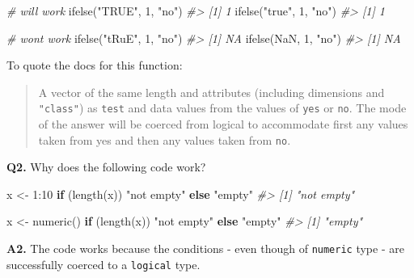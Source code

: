 \documentclass[
]{book}
\newenvironment{Shaded}{\begin{snugshade}}{\end{snugshade}}
\newcommand{\CommentTok}[1]{\textcolor[rgb]{0.56,0.35,0.01}{\textit{#1}}}
\newcommand{\ConstantTok}[1]{\textcolor[rgb]{0.00,0.00,0.00}{#1}}
\newcommand{\ControlFlowTok}[1]{\textcolor[rgb]{0.13,0.29,0.53}{\textbf{#1}}}
\newcommand{\DecValTok}[1]{\textcolor[rgb]{0.00,0.00,0.81}{#1}}
\newcommand{\FunctionTok}[1]{\textcolor[rgb]{0.00,0.00,0.00}{#1}}
\newcommand{\NormalTok}[1]{#1}
\newcommand{\OtherTok}[1]{\textcolor[rgb]{0.56,0.35,0.01}{#1}}
\newcommand{\SpecialCharTok}[1]{\textcolor[rgb]{0.00,0.00,0.00}{#1}}
\newcommand{\StringTok}[1]{\textcolor[rgb]{0.31,0.60,0.02}{#1}}
\begin{document}
\begin{Shaded}
\begin{Highlighting}[]
\CommentTok{\# will work}
\FunctionTok{ifelse}\NormalTok{(}\StringTok{"TRUE"}\NormalTok{, }\DecValTok{1}\NormalTok{, }\StringTok{"no"}\NormalTok{)}
\CommentTok{\#\textgreater{} [1] 1}
\FunctionTok{ifelse}\NormalTok{(}\StringTok{"true"}\NormalTok{, }\DecValTok{1}\NormalTok{, }\StringTok{"no"}\NormalTok{)}
\CommentTok{\#\textgreater{} [1] 1}

\CommentTok{\# won\textquotesingle{}t work}
\FunctionTok{ifelse}\NormalTok{(}\StringTok{"tRuE"}\NormalTok{, }\DecValTok{1}\NormalTok{, }\StringTok{"no"}\NormalTok{)}
\CommentTok{\#\textgreater{} [1] NA}
\FunctionTok{ifelse}\NormalTok{(}\ConstantTok{NaN}\NormalTok{, }\DecValTok{1}\NormalTok{, }\StringTok{"no"}\NormalTok{)}
\CommentTok{\#\textgreater{} [1] NA}
\end{Highlighting}
\end{Shaded}

To quote the docs for this function:

\begin{quote}
A vector of the same length and attributes (including dimensions and \texttt{"class"}) as \texttt{test} and data values from the values of \texttt{yes} or \texttt{no}. The mode of the answer will be coerced from logical to accommodate first any values taken from yes and then any values taken from \texttt{no}.
\end{quote}

\textbf{Q2.} Why does the following code work?

\begin{Shaded}
\begin{Highlighting}[]
\NormalTok{x }\OtherTok{\textless{}{-}} \DecValTok{1}\SpecialCharTok{:}\DecValTok{10}
\ControlFlowTok{if}\NormalTok{ (}\FunctionTok{length}\NormalTok{(x)) }\StringTok{"not empty"} \ControlFlowTok{else} \StringTok{"empty"}
\CommentTok{\#\textgreater{} [1] "not empty"}

\NormalTok{x }\OtherTok{\textless{}{-}} \FunctionTok{numeric}\NormalTok{()}
\ControlFlowTok{if}\NormalTok{ (}\FunctionTok{length}\NormalTok{(x)) }\StringTok{"not empty"} \ControlFlowTok{else} \StringTok{"empty"}
\CommentTok{\#\textgreater{} [1] "empty"}
\end{Highlighting}
\end{Shaded}

\textbf{A2.} The code works because the conditions - even though of \texttt{numeric} type - are successfully coerced to a \texttt{logical} type.
\end{document}
